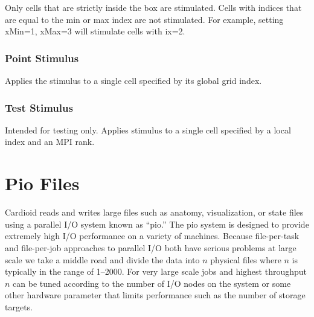 \documentclass{article}
\begin{document}
  Only cells
that are strictly inside the box are stimulated.  Cells with indices
that are equal to the min or max index are not stimulated.  For example,
setting xMin=1, xMax=3 will stimulate cells with ix=2.

\subsubsection{Point Stimulus}
Applies the stimulus to a single cell specified by its global grid index.

\begin{keywords}
\end{keywords}

\subsubsection{Test Stimulus}
Intended for testing only.  Applies stimulus to a single cell specified
by a local index and an MPI rank.

\begin{keywords}
\end{keywords}


\section{Pio Files}
\label{sec:pio}

Cardioid reads and writes large files such as anatomy, visualization, or
state files using a parallel I/O system known as ``pio.''  The pio
system is designed to provide extremely high I/O performance on a
variety of machines.  Because file-per-task and file-per-job approaches
to parallel I/O both have serious problems at large scale we take a
middle road and divide the data into $n$ physical files where $n$ is
typically in the range of 1--2000.  For very large scale jobs and
highest throughput $n$ can be tuned according to the number of I/O nodes
on the system or some other hardware parameter that limits performance
such as the number of storage targets.
\end{document}
